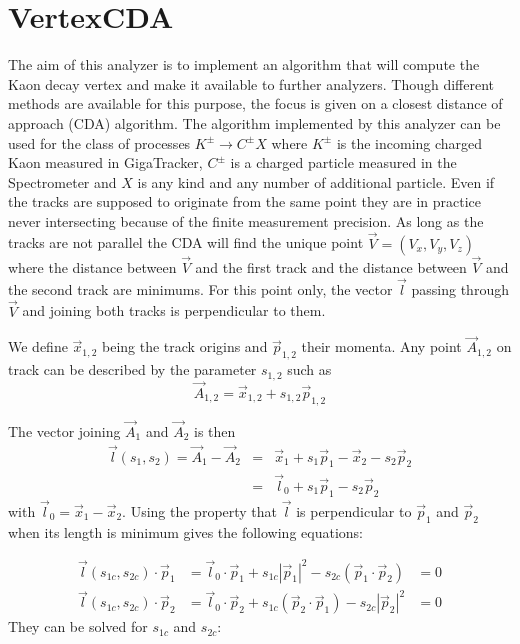 \section{VertexCDA}

\newcommand{\p}[1]{\vec{p}_{#1}}
\newcommand{\ap}[1]{|\vec{p}_{#1}|^2}
\newcommand{\lv}{\vec{l}}
\newcommand{\lz}{\vec{l}_{0}}
\newcommand{\C}[1]{\vec{A}_{#1}}
\newcommand{\x}[1]{\vec{x}_{#1}}

The aim of this analyzer is to implement an algorithm that will compute the Kaon
decay vertex and make it available to further analyzers. Though different
methods are available for this purpose, the focus is given on a closest distance
of approach (CDA) algorithm. The algorithm implemented by this analyzer can be
used for the class of processes $K^\pm\to C^\pm X$ where $K^\pm$ is the
incoming charged Kaon measured in GigaTracker, $C^\pm$ is a charged particle
measured in the Spectrometer and $X$ is any kind and any number of additional particle. Even if the
tracks are supposed to originate from the same point they are in practice never intersecting
because of the finite measurement precision. As long as the tracks are not parallel the CDA will
find the unique point $\vec{V}=(V_x,V_y,V_z)$ where the distance between $\vec{V}$ and the first
track and the distance between $\vec{V}$ and the second track are minimums. For this point only,
the vector $\lv$ passing through $\vec{V}$ and joining both tracks is perpendicular to
them.

We define $\vec{x}_{1,2}$ being the track origins and $\p{1,2}$ their
momenta. Any point $\C{1,2}$ on track can be described by the parameter $s_{1,2}$ such as
\begin{equation}
	\C{1,2} = \x{1,2} + s_{1,2} \p{1,2}
\end{equation}

The vector joining $\C{1}$ and $\C{2}$ is then
\begin{eqnarray}
	\lv(s_1,s_2)=\C{1}-\C{2} &=& \x{1}+s_1\p{1} - \x{2} - s_2\p{2}\\
	&=& \lz + s_1\p{1} - s_2\p{2}
\end{eqnarray}
with $\lz = \x{1}-\x{2}$. Using the property that $\lv$ is perpendicular to
$\p{1}$ and $\p{2}$ when its length is minimum gives the following
equations:

\begin{align}
	\lv(s_{1c},s_{2c})\cdot\p{1} &= \lz\cdot\p{1} + s_{1c}\ap{1} -
	s_{2c}(\p{1}\cdot\p{2}) &= 0
	\\
	\lv(s_{1c},s_{2c})\cdot\p{2} &= \lz\cdot\p{2} + s_{1c}(\p{2}\cdot\p{1}) -
	s_{2c}\ap{2} &= 0
\end{align}
They can be solved for $s_{1c}$ and $s_{2c}$:

